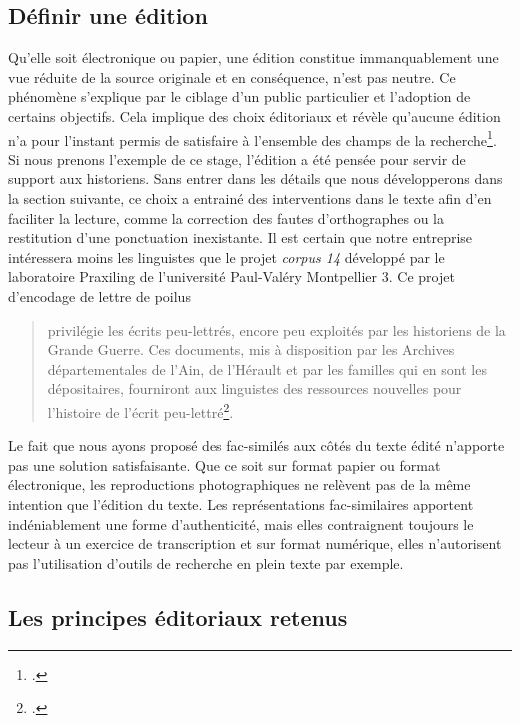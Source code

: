 \documentclass[12pt,a4paper]{book} %
\begin{document}
\subsection{Définir une édition}
Qu'elle soit électronique ou papier, une édition constitue immanquablement une vue réduite de la source originale et en conséquence, n'est pas neutre. Ce phénomène s'explique par le ciblage d'un public particulier et l'adoption de certains objectifs. Cela implique des choix éditoriaux et révèle qu'aucune édition n'a pour l'instant permis de satisfaire à l'ensemble des champs de la recherche\footcite{vanhoutte_describing_2009}.
Si nous prenons l'exemple de ce stage, l'édition a été pensée pour servir de support aux historiens. Sans entrer dans les détails que nous développerons dans la section suivante, ce choix a entrainé des interventions dans le texte afin d'en faciliter la lecture, comme la correction des fautes d'orthographes ou la restitution d'une ponctuation inexistante. Il est certain que notre entreprise intéressera moins les linguistes que le projet \textit{corpus 14} développé par le laboratoire Praxiling de l'université Paul-Valéry Montpellier 3. Ce projet d'encodage de lettre de poilus 

\begin{quote}
 privilégie les écrits peu-lettrés, encore peu exploités par les historiens de la Grande Guerre. Ces documents, mis à disposition par les Archives départementales de l'Ain, de l'Hérault et par les familles qui en sont les dépositaires, fourniront aux linguistes des ressources nouvelles pour l'histoire de l'écrit peu-lettré\footcite{_projet_????}.%
\end{quote} 
Le fait que nous ayons proposé des fac-similés aux côtés du texte édité n'apporte pas une solution satisfaisante. Que ce soit sur format papier ou format électronique, les reproductions photographiques ne relèvent pas de la même intention que l'édition du texte. Les représentations fac-similaires apportent indéniablement une forme d'authenticité, mais elles contraignent toujours le lecteur à un exercice de transcription et sur format numérique, elles n'autorisent pas l'utilisation d'outils de recherche en plein texte par exemple.  

\subsection{Les principes éditoriaux retenus}
\end{document}
